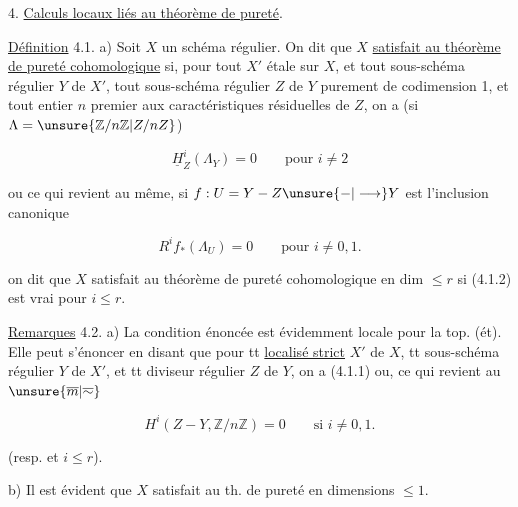 4. \uline{Calculs  locaux liés au théorème de pureté}.

\uline{Définition} 4.1. a) Soit $X$ un schéma régulier. On dit que $X$ \uline{satisfait au théorème de pureté cohomologique} si, pour tout  $X'$ étale sur $X$, et tout  sous-schéma régulier $Y$ de $X'$,  tout sous-schéma régulier $Z$ de $Y$ purement de codimension 1,   et tout entier $n$ premier aux  caractéristiques résiduelles de $Z$, on a (si $\Lambda=\unsure{\mathbb Z/n\mathbb Z|Z/nZ}$)

\[
\underline H^i_Z(\Lambda_Y)=0\qquad\text{pour }i\ne 2
\tag*{(4.1.1)}
\]

ou ce qui revient au même, si $f:U=Y-Z\unsure{{-}|\longrightarrow}Y$ est l'inclusion canonique

\[
R^i f_*(\Lambda_U)=0\qquad\text{pour }i\ne 0,1.
\tag*{(4.1.2)}
\]

  on dit que $X$ satisfait au théorème de pureté cohomologique en dim $\leq r$ si  (4.1.2) est vrai pour $i\leq r$.

\uline{Remarques} 4.2. a) La condition énoncée   est  évidemment locale pour la top. (ét). Elle peut s'énoncer  en disant que pour tt \uline{localisé strict} $X'$ de $X$, tt sous-schéma régulier $Y$ de $X'$, et tt diviseur régulier $Z$ de $Y$,  on a (4.1.1) ou, ce qui revient au $\unsure{\overline{m}|\overline{\sim}}$

\[
H^i(Z-Y,\mathbb Z/n\mathbb Z)=0\qquad\text{si }i\ne 0,1.
\]

(resp. et $i\leq r$). 

b) Il est évident  que  $X$ satisfait au th. de pureté  en dimensions $\leq 1$.
